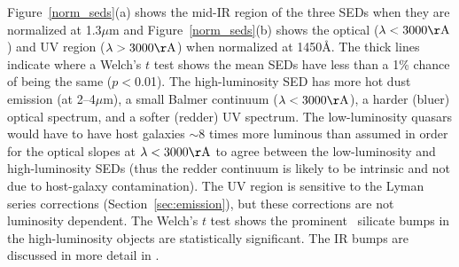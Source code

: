Figure~\ref{norm_seds}(a) shows the mid-IR region of the three SEDs when they are normalized at 1.3$\mu$m and Figure~\ref{norm_seds}(b) shows the optical ($\lambda<3000{\rm \AA}$) and UV region ($\lambda>3000{\rm \AA}$) when normalized at 1450\AA. The thick lines indicate where a Welch's $t$ test shows the mean SEDs have less than a 1\% chance of being the same ($p<$0.01).  The high-luminosity SED has more hot dust emission (at 2--4$\mu$m), a small Balmer continuum ($\lambda<3000{\rm \AA}$), a harder (bluer) optical spectrum, and a softer (redder) UV spectrum.
The low-luminosity quasars would have to have host galaxies $\sim$8 times more luminous than assumed in order for the optical slopes at $\lambda<3000{\rm \AA}$ to agree between the low-luminosity and high-luminosity SEDs (thus the redder continuum is likely to be intrinsic and not due to host-galaxy contamination).  The UV region is sensitive to the Lyman series corrections (Section~\ref{sec:emission}), but these corrections are not luminosity dependent.  The Welch's $t$ test shows the prominent \tenmum\ silicate bumps in the high-luminosity objects are statistically significant.
The IR bumps are discussed in more detail in \citet{Gallagher:2007a}. %


